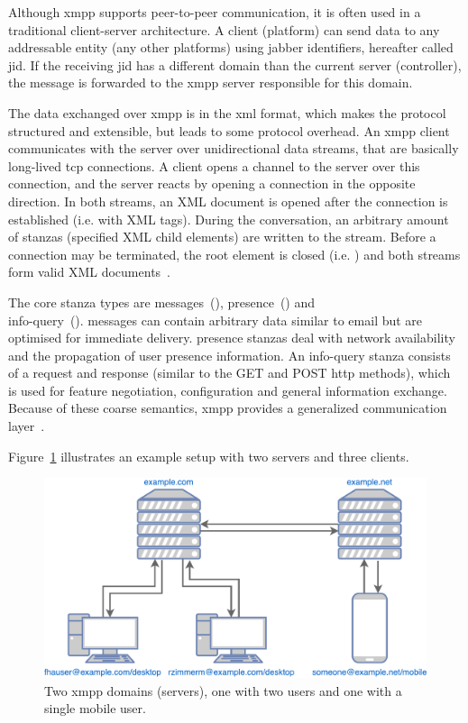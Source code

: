 Although \gls{xmpp} supports peer-to-peer communication, it is often used in a traditional client-server architecture.
A client (\gls{platform}) can send data to any addressable entity (any other \glspl{platform}) using \Gls{jabber} identifiers, hereafter called \gls{jid}.
If the receiving \gls{jid} has a different domain than the current server (\gls{controller}), the message is forwarded to the \gls{xmpp} server responsible for this domain.~\cite{rfc6120}

The data exchanged over \gls{xmpp} is in the \gls{xml} format, which makes the protocol structured and extensible, but leads to some protocol overhead.
An \gls{xmpp} client communicates with the server over unidirectional data streams, that are basically long-lived \gls{tcp} connections.
A client opens a channel to the server over this connection, and the server reacts by opening a connection in the opposite direction.
In both streams, an XML document is opened after the connection is established (i.e. with  XML tags).
During the conversation, an arbitrary amount of \glspl{stanza} (specified XML child elements) are written to the stream.
Before a connection may be terminated, the root element is closed (i.e. ) and both streams form valid XML documents~\cite{rfc6120, professional-xmpp}.

The core \gls{stanza} types are \glspl{message}~(), \gls{presence}~() and\\
\gls{info-query}~().
\Glspl{message} can contain arbitrary data similar to email but are optimised for immediate delivery.
\Gls{presence} \glspl{stanza} deal with network availability and the propagation of user presence information.
An \gls{info-query} \gls{stanza} consists of a request and response (similar to the GET and POST \gls{http} methods), which is used for feature negotiation, configuration and general information exchange.
Because of these coarse semantics, \gls{xmpp} provides a generalized communication layer~\cite{rfc6120, ieee-xplore-stream-xml-xmpp}.

Figure~\ref{fig:xmpp-overview} illustrates an example setup with two servers and three clients.

\begin{figure}[h]
	\centering
	\includegraphics[width=0.8\linewidth]{resources/xmpp_overview.pdf}
	\caption[XMPP example overview]{Two \gls{xmpp} domains (servers), one with two users and one with a single mobile user.}
	\label{fig:xmpp-overview}
\end{figure}

